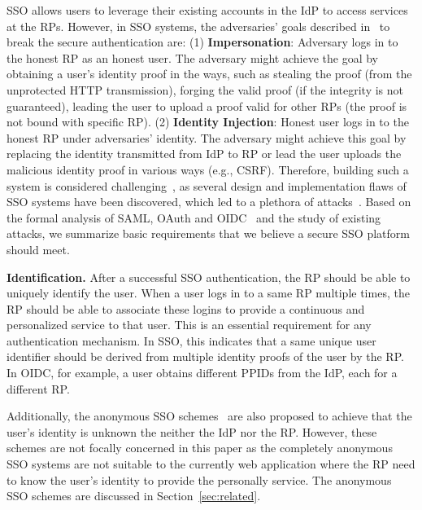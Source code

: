 SSO allows users to leverage their existing accounts in the IdP to access services at the RPs.
{\color{red}However, in SSO systems, the adversaries' goals described in~\cite{SPRESSO} to break the secure authentication are:
(1) \textbf{Impersonation}: Adversary logs in to the honest RP as an honest user. The adversary might achieve the goal by obtaining a user's identity proof in the ways, such as stealing the proof (from the unprotected HTTP transmission), forging the valid proof (if the integrity is not guaranteed), leading the user to upload a proof valid for other RPs (the proof is not bound with specific RP).
(2) \textbf{Identity Injection}: Honest user logs in to the honest RP under adversaries' identity. The adversary might achieve this goal by replacing the identity transmitted from IdP to RP or lead the user uploads the malicious identity proof in various ways (e.g., CSRF).}
{\color{red} Therefore, building} such a system is considered challenging~\cite{SPRESSO}, as several design and implementation flaws of SSO systems have been discovered, which led to a plethora of attacks~\cite{SomorovskyMSKJ12,WangCW12,ArmandoCCCPS13,ZhouE14,WangZLLYLG15,WangZLG16,YangLLZH16,MainkaMS16,MohsenS16,MainkaMSW17,YangLCZ18,YangLS17,ShiWL19}.
Based on the formal analysis of SAML, OAuth and OIDC~\cite{ArmandoCCCT08,FettKS16, FettKS17} and the study of existing attacks, we summarize basic requirements that we believe a secure SSO platform should meet.

\vspace{1mm}\noindent\textbf{Identification.} %
After a successful SSO authentication, the RP should be able to uniquely identify the user. When a user logs in to a same RP multiple times, the RP should be able to associate these logins to provide a continuous and personalized service to that user. This is an essential requirement for any authentication mechanism. In SSO, this indicates that a same unique user identifier should be derived from multiple identity proofs of the user by the RP. In OIDC, for example, a user obtains different PPIDs from the IdP, each for a different RP.

{\color{red}Additionally, the anonymous SSO schemes~\cite{ElmuftiWRR08,WangWS13,HanCSTW18} are also proposed to achieve that the user's identity is unknown the neither the IdP nor the RP. However, these schemes are not focally concerned in this paper as the completely anonymous SSO systems are not suitable to the currently web application where the RP need to know the user's identity to provide the personally service. The anonymous SSO schemes are discussed in Section~\ref{sec:related}.}

